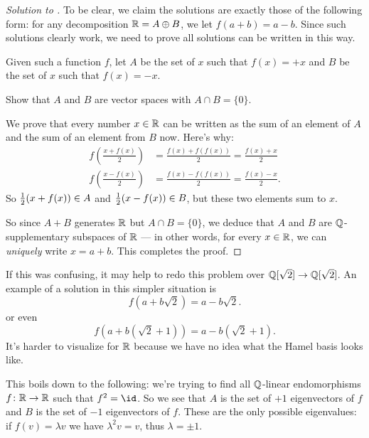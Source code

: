 \documentclass[11pt]{scrartcl}
\begin{document}
\begin{proof}[Solution to ]
  To be clear, we claim the solutions are exactly those of the following form:
  for any decomposition $\mathbb R = A \oplus B$,
  we let $f(a+b) = a-b$.
  Since such solutions clearly work, we need to prove all solutions
  can be written in this way.

  Given such a function $f$,
  let $A$ be the set of $x$ such that $f(x) = +x$
  and $B$ be the set of $x$ such that $f(x) = -x$.
  \begin{exercise}
    Show that $A$ and $B$ are vector spaces with $A \cap B = \{0\}$.
  \end{exercise}

  We prove that every number $x \in \mathbb R$ can be written as the sum of an element of $A$
  and the sum of an element from $B$ now.
  Here's why:
  \begin{align*}
    f\left( \frac{x+f(x)}{2} \right) &= \frac{f(x)+f(f(x))}{2} = \frac{f(x)+x}{2} \\
    f\left( \frac{x-f(x)}{2} \right) &= \frac{f(x)-f(f(x))}{2} = \frac{f(x)-x}{2}.
  \end{align*}
  So $\frac{1}{2}(x+f(x)) \in A$ and $\frac{1}{2}(x-f(x)) \in B$, but these two elements sum to $x$.

  So since $A+B$ generates $\mathbb R$ but $A \cap B = \{0\}$,
  we deduce that $A$ and $B$ are $\mathbb Q$-supplementary subspaces of $\mathbb R$
  --- in other words, for every $x \in \mathbb R$,
  we can \emph{uniquely} write $x = a + b$.
  This completes the proof.
\end{proof}

If this was confusing, it may help to redo this problem over $\mathbb Q[\sqrt2] \to \mathbb Q[\sqrt2]$.
An example of a solution in this simpler situation is
\[ f(a+b\sqrt2) = a-b\sqrt2. \]
or even
\[ f(a+b(\sqrt2+1)) = a-b(\sqrt2+1). \]
It's harder to visualize for $\mathbb R$ because we have no idea what the Hamel basis looks like.

\begin{remark}
  This boils down to the following: we're trying to find all $\mathbb Q$-linear endomorphisms
  $f \colon \mathbb R \to \mathbb R$ such that $f^2 = \id$.
  So we see that $A$ is the set of $+1$ eigenvectors of $f$
  and $B$ is the set of $-1$ eigenvectors of $f$.
  These are the only possible eigenvalues:
  if $f(v) = \lambda v$ we have $\lambda^2 v = v$,
  thus $\lambda = \pm 1$.
\end{remark}
\end{document}

